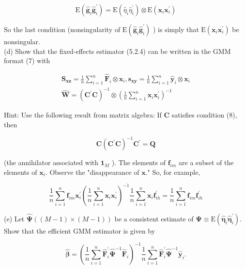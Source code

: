 \documentclass[10pt]{article}
\begin{document}
$$
\mathrm{E}\left(\hat{\mathbf{g}}_{i} \hat{\mathbf{g}}_{i}^{\prime}\right)=\mathrm{E}\left(\hat{\eta}_{i} \hat{\eta}_{i}^{\prime}\right) \otimes \mathrm{E}\left(\mathbf{x}_{i} \mathbf{x}_{i}^{\prime}\right)
$$

So the last condition (nonsingularity of $\mathrm{E}\left(\hat{\mathbf{g}}_{i} \hat{\mathbf{g}}_{i}^{\prime}\right)$ ) is simply that $\mathrm{E}\left(\mathbf{x}_{i} \mathbf{x}_{i}^{\prime}\right)$ be nonsingular.\\
(d) Show that the fixed-effects estimator (5.2.4) can be written in the GMM format (7) with


\begin{gather*}
\mathbf{S}_{\mathbf{x z}}=\frac{1}{n} \sum_{i=1}^{n} \widehat{\mathbf{F}}_{i} \otimes \mathbf{x}_{i}, \mathbf{s}_{\mathbf{x y}}=\frac{1}{n} \sum_{i=1}^{n} \hat{\mathbf{y}}_{i} \otimes \mathbf{x}_{i}  \tag{10}\\
\widehat{\mathbf{W}}=\left(\mathbf{C}^{\prime} \mathbf{C}\right)^{-1} \otimes\left(\frac{1}{n} \sum_{i=1}^{n} \mathbf{x}_{i} \mathbf{x}_{i}^{\prime}\right)^{-1}
\end{gather*}


Hint: Use the following result from matrix algebra: If $\mathbf{C}$ satisfies condition (8), then


\begin{equation*}
\mathbf{C}\left(\mathbf{C}^{\prime} \mathbf{C}\right)^{-1} \mathbf{C}^{\prime}=\mathbf{Q} \tag{11}
\end{equation*}


(the annihilator associated with $\mathbf{1}_{M}$ ). The elements of $\mathbf{f}_{i m}$ are a subset of the elements of $\mathbf{x}_{i}$. Observe the "disappearance of $\mathbf{x}$." So, for example,

$$
\frac{1}{n} \sum_{i=1}^{n} \mathbf{f}_{i m} \mathbf{x}_{i}^{\prime}\left(\frac{1}{n} \sum_{i=1}^{n} \mathbf{x}_{i} \mathbf{x}_{i}^{\prime}\right)^{-1} \frac{1}{n} \sum_{i=1}^{n} \mathbf{x}_{i} \mathbf{f}_{i h}^{\prime}=\frac{1}{n} \sum_{i=1}^{n} \mathbf{f}_{i m} \mathbf{f}_{i h}^{\prime}
$$

(e) Let $\widehat{\boldsymbol{\Psi}}((M-1) \times(M-1))$ be a consistent estimate of $\boldsymbol{\Psi} \equiv \mathrm{E}\left(\hat{\boldsymbol{\eta}}_{i} \hat{\boldsymbol{\eta}}_{i}^{\prime}\right)$. Show that the efficient GMM estimator is given by


\begin{equation*}
\widehat{\boldsymbol{\beta}}=\left(\frac{1}{n} \sum_{i=1}^{n} \widehat{\mathbf{F}}_{i}^{\prime} \widehat{\boldsymbol{\Psi}}^{-1} \widehat{\mathbf{F}}_{i}\right)^{-1} \frac{1}{n} \sum_{i=1}^{n} \widehat{\mathbf{F}}_{i}^{\prime} \widehat{\boldsymbol{\Psi}}^{-1} \hat{\mathbf{y}}_{i} . \tag{12}
\end{equation*}
\end{document}
